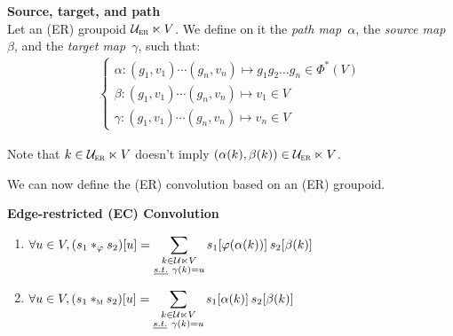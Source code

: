 \begin{definition}\textbf{Source, target, and path}\\
Let an (ER) groupoid $\cuer \ltimes V$. We define on it the \emph{path map}~$\alpha$, the \emph{source map}~$\beta$, and the \emph{target map}~$\gamma$, such that:
\begin{gather*}
\begin{cases}
  \alpha: (g_1,v_1) \cdots (g_n,v_n) \mapsto g_1g_2\ldots g_n \in \Phi^*(V)\\
  \beta: (g_1,v_1) \cdots (g_n,v_n) \mapsto v_1 \in V\\
  \gamma: (g_1,v_1) \cdots (g_n,v_n) \mapsto v_n \in V
\end{cases}
\end{gather*}
\end{definition}

\begin{remark}Note that $k \in \cuer \ltimes V$ doesn't imply $(\alpha(k), \beta(k)) \in \cuer \ltimes V$.
\end{remark}

We can now define the (ER) convolution based on an (ER) groupoid.

\begin{definition}\textbf{Edge-restricted (EC) Convolution}\\
\begin{enumerate}[label=(\roman*)]
\item $\forall u \in V, (s_1 \ast_\varphi s_2) [u] = \displaystyle\sum_{\substack{k \in \cu \ltimes V\\ \st \gamma(k)=u}} s_1[\varphi(\alpha(k))] \h{2} s_2[\beta(k)]$
\item $\forall u \in V, (s_1 \ast_{\M} s_2) [u] = \displaystyle\sum_{\substack{k \in \cu \ltimes V\\ \st \gamma(k)=u}} s_1[\alpha(k)] \h{2} s_2[\beta(k)]$
\end{enumerate}
\end{definition}

